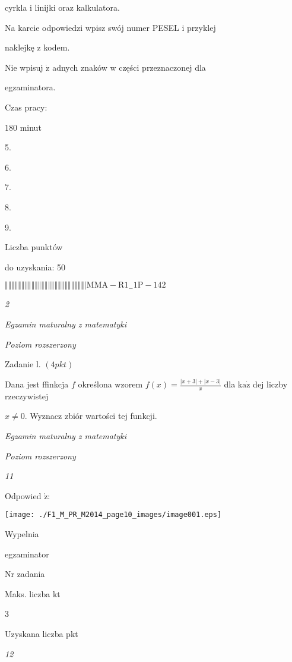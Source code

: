 \documentclass[a4paper,12pt]{article}
\begin{document}
cyrkla i linijki oraz kalkulatora.

Na karcie odpowiedzi wpisz swój numer PESEL i przyklej

naklejkę z kodem.

Nie wpisuj $\dot{\mathrm{z}}$ adnych znaków w części przeznaczonej dla

egzaminatora.

Czas pracy:

180 minut

5.

6.

7.

8.

9.

Liczba punktów

do uzyskania: 50

$\Vert\Vert\Vert\Vert\Vert\Vert\Vert\Vert\Vert\Vert\Vert\Vert\Vert\Vert\Vert\Vert\Vert\Vert\Vert\Vert\Vert\Vert\Vert\Vert|  \mathrm{M}\mathrm{M}\mathrm{A}-\mathrm{R}1_{-}1\mathrm{P}-142$




{\it 2}

{\it Egzamin maturalny z matematyki}

{\it Poziom rozszerzony}

Zadanie l. $(4pkt)$

Dana jest ffinkcja $f$ określona wzorem $f(x)=\displaystyle \frac{|x+3|+|x-3|}{x}$ dla $\mathrm{k}\mathrm{a}\dot{\mathrm{z}}$ dej liczby rzeczywistej

$x\neq 0$. Wyznacz zbiór wartości tej funkcji.





{\it Egzamin maturalny z matematyki}

{\it Poziom rozszerzony}

{\it 11}

Odpowied $\acute{\mathrm{z}}$:
\begin{center}
\texttt{[image: ./F1\_M\_PR\_M2014\_page10\_images/image001.eps]}
\end{center}
Wypelnia

egzaminator

Nr zadania

Maks. liczba kt

3

Uzyskana liczba pkt





{\it 12}
\end{document}
